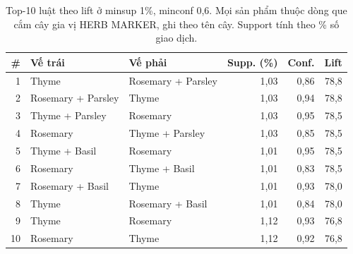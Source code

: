 \begin{table}[!t]
\centering
\caption{Top-10 luật theo lift ở minsup 1\%, minconf 0,6. Mọi sản phẩm thuộc dòng que cắm cây gia vị HERB MARKER,
ghi theo tên cây. Support tính theo \% số giao dịch.}
\label{tab:app1-top10}
\footnotesize\setlength{\tabcolsep}{4pt}
\begin{tabular}{rllrrr}\hline
\# & Vế trái & Vế phải & Supp. (\%) & Conf. & Lift\\\hline
1 & Thyme & Rosemary + Parsley & 1{,}03 & 0{,}86 & 78{,}8\\
2 & Rosemary + Parsley & Thyme & 1{,}03 & 0{,}94 & 78{,}8\\
3 & Thyme + Parsley & Rosemary & 1{,}03 & 0{,}95 & 78{,}5\\
4 & Rosemary & Thyme + Parsley & 1{,}03 & 0{,}85 & 78{,}5\\
5 & Thyme + Basil & Rosemary & 1{,}01 & 0{,}95 & 78{,}5\\
6 & Rosemary & Thyme + Basil & 1{,}01 & 0{,}83 & 78{,}5\\
7 & Rosemary + Basil & Thyme & 1{,}01 & 0{,}93 & 78{,}0\\
8 & Thyme & Rosemary + Basil & 1{,}01 & 0{,}84 & 78{,}0\\
9 & Thyme & Rosemary & 1{,}12 & 0{,}93 & 76{,}8\\
10 & Rosemary & Thyme & 1{,}12 & 0{,}92 & 76{,}8\\
\hline
\end{tabular}
\end{table}

